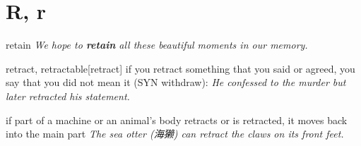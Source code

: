 \section{R, r}

\begin{word}{retain}
    \textit{We hope to \textbf{retain} all these beautiful moments in our memory.}
\end{word}

\begin{word}{retract, retractable}[retract]
    if you retract something that you said or agreed, you say that you did not mean it (SYN  withdraw):
    \textit{He confessed to the murder but later retracted his statement.}

    if part of a machine or an animal's body retracts or is retracted, it moves back into the main part
    \textit{The sea otter (海獭) can retract the claws on its front feet.}
\end{word}